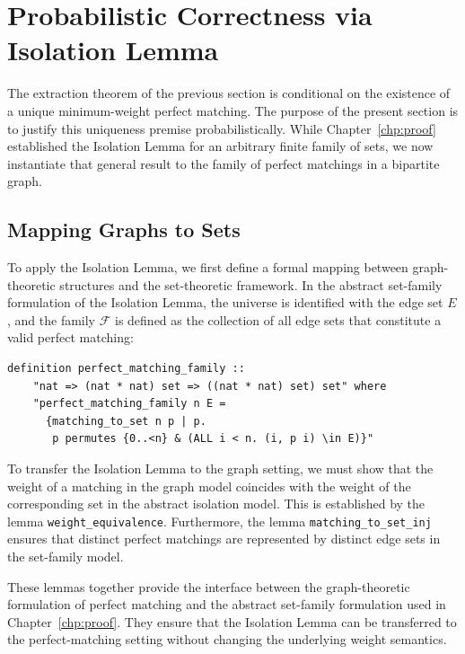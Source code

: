 \section{Probabilistic Correctness via Isolation Lemma}
\label{sec:matching_prob_correctness}

The extraction theorem of the previous section is conditional on the existence of a unique minimum-weight perfect matching.
The purpose of the present section is to justify this uniqueness premise probabilistically.
While Chapter~\ref{chp:proof} established the Isolation Lemma for an arbitrary finite family of sets,
we now instantiate that general result to the family of perfect matchings in a bipartite graph.

\subsection{Mapping Graphs to Sets}
To apply the Isolation Lemma, we first define a formal mapping between graph-theoretic structures and the set-theoretic framework.
In the abstract set-family formulation of the Isolation Lemma, the universe is identified with the edge set $E$, and the family $\mathcal{F}$ is defined as the collection of all edge sets that constitute a valid perfect matching:

\listingneedspace
\begin{lstlisting}[language=Isabelle, caption={Perfect Matching Family}]
definition perfect_matching_family :: 
    "nat => (nat * nat) set => ((nat * nat) set) set" where
    "perfect_matching_family n E = 
      {matching_to_set n p | p. 
       p permutes {0..<n} & (ALL i < n. (i, p i) \in E)}"
\end{lstlisting}

To transfer the Isolation Lemma to the graph setting, we must show that the weight of a matching in the graph model coincides with the weight of the corresponding set in the abstract isolation model.
This is established by the lemma \texttt{weight\_equivalence}.
Furthermore, the lemma \texttt{matching\_to\_set\_inj} ensures that distinct perfect matchings are represented by distinct edge sets in the set-family model.

These lemmas together provide the interface between the graph-theoretic formulation of perfect matching and the abstract set-family formulation used in Chapter~\ref{chp:proof}.
They ensure that the Isolation Lemma can be transferred to the perfect-matching setting without changing the underlying weight semantics.

